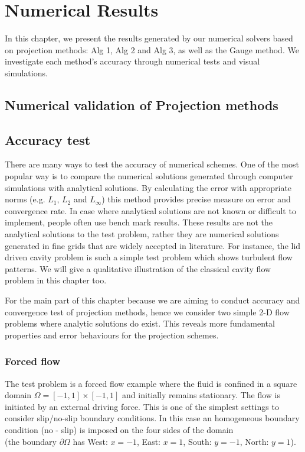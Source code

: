 \chapter{Numerical Results}
\label{chapter 6}
In this chapter, we present the results generated by our numerical solvers based on projection methods: Alg 1, Alg 2 and Alg 3, as well as the Gauge method. We investigate each method's accuracy through numerical tests and visual simulations.

\section*{Numerical validation of Projection methods}
\section{Accuracy test}
There are many ways to test the accuracy of numerical schemes. One of the most popular way is to compare the numerical solutions generated through computer simulations with analytical solutions. By calculating the error with appropriate norms (e.g. $L_1,\,L_2$ and $L_\infty$) this method provides precise measure on error and convergence rate. In case where analytical solutions are not known or difficult to implement, people often use bench mark results. These results are not the analytical solutions to the test problem, rather they are numerical solutions generated in fine grids that are widely accepted in literature. For instance, the lid driven cavity problem is such a simple test problem which shows turbulent flow patterns. We will give a qualitative illustration of the classical cavity flow problem in this chapter too.

For the main part of this chapter because we are aiming to conduct accuracy and convergence test of projection methods, hence we consider two simple 2-D flow problems where analytic solutions do exist. This reveals more fundamental properties and error behaviours for the projection schemes.\\

\subsection{Forced flow}
The test problem is a forced flow example where the fluid is confined in a square domain $\Omega = [-1,1] \times [-1,1]$ and initially remains stationary. The flow is initiated by an external driving force. This is one of the simplest settings to consider slip/no-slip boundary conditions. In this case an homogeneous boundary condition (no - slip) is imposed on the four sides of the domain \\
(the boundary $\partial \Omega$ has West: $x = -1$, East: $x=1$, South: $y = -1$, North: $y=1$).\\

